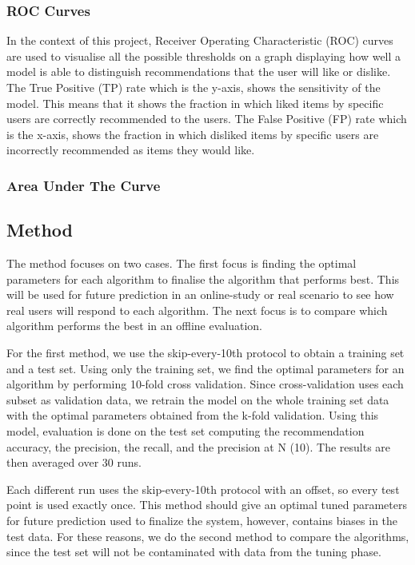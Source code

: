 \subsubsection{ROC Curves} \label{roc}
In the context of this project, Receiver Operating Characteristic (ROC) curves  are used to visualise all the possible thresholds on a graph displaying how well a model is able to distinguish recommendations that the user will like or dislike. The True Positive (TP) rate which is the y-axis, shows the sensitivity of the model. This means that it shows the fraction in which liked items by specific users are correctly recommended to the users. The False Positive (FP) rate which is the x-axis, shows the fraction in which disliked items by specific users are incorrectly recommended as items they would like. 

\subsubsection{Area Under The Curve} \label{auc}


\subsection{Method} \label{method}


The method focuses on two cases. The first focus is finding the optimal parameters for each algorithm to finalise the algorithm that performs best. This will be used for future prediction in an online-study or real scenario to see how real users will respond to each algorithm. The next focus is to compare which algorithm performs the best in an offline evaluation.

For the first method, we use the skip-every-10th protocol to obtain a training set and a test set. Using only the training set, we find the optimal parameters for an algorithm by performing 10-fold cross validation. Since cross-validation uses each subset as validation data, we retrain the model on the whole training set data with the optimal parameters obtained from the k-fold validation. Using this model, evaluation is done on the test set computing the recommendation accuracy, the precision, the recall, and the precision at N (10). The results are then averaged over 30 runs. 

 Each different run uses the skip-every-10th protocol with an offset, so every test point is used exactly once. This method should give an optimal tuned parameters for future prediction used to finalize the system, however, contains biases in the test data. For these reasons, we do the second method to compare the algorithms, since the test set will not be contaminated with data from the tuning phase.

